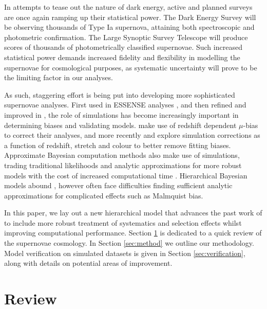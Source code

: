 \documentclass[a4paper,fleqn,usenatbib]{mnras}
\begin{document}
In attempts to tease out the nature of dark energy, active and planned surveys are once again ramping up their statistical power. The Dark Energy Survey \citep[DES,][]{Bernstein2012, Abbott2016} will be observing thousands of Type Ia supernova, attaining both spectroscopic and photometric confirmation. The Large Synoptic Survey Telescope \citep[LSST,][]{Ivezic2008, LSSTScienceCollaboration2009} will produce scores of thousands of photometrically classified supernovae. Such increased statistical power demands increased fidelity and flexibility in modelling the supernovae for cosmological purposes, as systematic uncertainty will prove to be the limiting factor in our analyses.

As such, staggering effort is being put into developing more sophisticated supernovae analyses. First used in ESSENSE analyses \citep{Wood-Vasey2007}, and then refined and improved in \citet{Kessler2009}, the role of simulations has become increasingly important in determining biases and validating models. \citet{Betoule2014} make use of redshift dependent $\mu$-bias to correct their analyses, and more recently \citet{Scolnic2016} and \citet{Kessler2017} explore simulation corrections as a function of redshift, stretch and colour to better remove fitting biases. Approximate Bayesian computation methods also make use of simulations, trading traditional likelihoods and analytic approximations for more robust models with the cost of increased computational time \citep{Weyant2013, Jennings2016}. Hierarchical Bayesian models abound \citep{Mandel2009, March2011, March2014, Rubin2015, Shariff2016, Roberts2017}, however often face difficulties finding sufficient analytic approximations for complicated effects such as Malmquist bias.


In this paper, we lay out a new hierarchical model that advances the past work of \citet{Rubin2015} to include more robust treatment of systematics and selection effects whilst improving computational performance. Section \ref{sec:review} is dedicated to a quick review of the supernovae cosmology. In Section \ref{sec:method} we outline our methodology. Model verification on simulated datasets is given in Section \ref{sec:verification}, along with details on potential areas of improvement.









\section{Review}
\label{sec:review}
\end{document}
